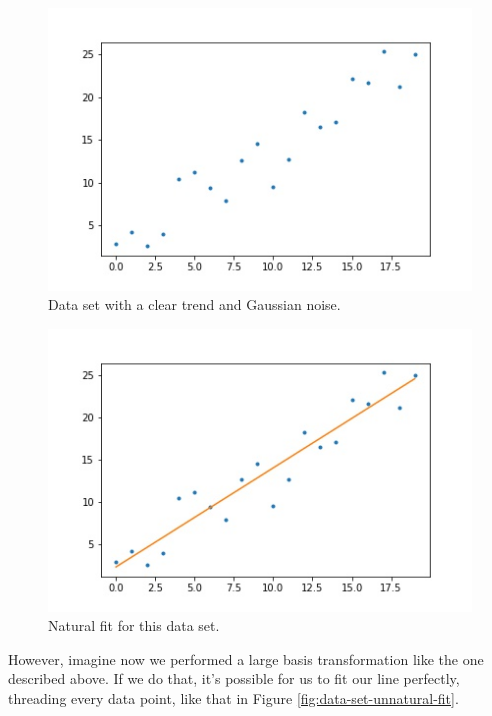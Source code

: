 \begin{figure}
    \centering
    \includegraphics[width=0.5\paperwidth]{../LinearRegression/fig/data_set_scattered_GEN.jpg}
    \caption{Data set with a clear trend and Gaussian noise.}
    \label{fig:data-set-scattered}
\end{figure}

\begin{figure}
    \centering
    \includegraphics[width=0.5\paperwidth]{../LinearRegression/fig/data_set_natural_fit_GEN.jpg}
    \caption{Natural fit for this data set.}
    \label{fig:data-set-natural-fit}
\end{figure}

However, imagine now we performed a large basis transformation like the one described above. If we do that, it's possible for us to fit our line perfectly, threading every data point, like that in Figure \ref{fig:data-set-unnatural-fit}.

